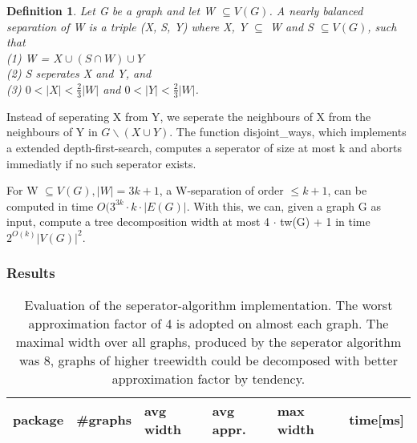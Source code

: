 \documentclass[a4wide]{article}
\newtheorem*{definition}{Definition}
\begin{document}
\begin{definition}
Let G be a graph and let W $\subseteq V(G)$. A nearly balanced separation of W is a triple (X, S, Y) where X, Y $\subseteq$ W and S $\subseteq V(G)$, such that \\

(1) W = $X \cup (S \cap W) \cup Y$ \\ 
(2) S seperates X and Y, and \\
(3) $0 < |X| < \frac{2}{3}|W|$ and $0 < |Y| < \frac{2}{3}|W|$.
\end{definition}

Instead of seperating X from Y, we seperate the neighbours of X from the neighbours of Y in $G \backslash (X \cup Y)$. The function disjoint\_ways, which implements a extended depth-first-search, computes a seperator of size at most k and aborts immediatly if no such seperator exists. 

\begin{algorithm}
\begin{algorithmic}[1]
\State {}
\State {}
\Else {}
\EndIf
\EndFor
{}
\end{algorithmic}
\end{algorithm}

For W $\subseteq V(G), |W| = 3k + 1$, a W-separation of order $\leq k + 1$, can be computed in time $O(3^{3k} \cdot k \cdot |E(G)|$. With this, we can, given a graph G as input, compute a tree decomposition width at most 4 $\cdot$ tw(G) + 1 in time $2^{O(k)}|V(G)|^{2}$. \\ 

\newpage

\subsubsection{Results}

\begin{table}[h!]
\begin{tabular}{|l|l|l|l|l|l|}
\hline
package & \#graphs & avg width & avg appr. & max width & time[ms] \\
\hline
\hline

\hline
\end{tabular}
\caption{Evaluation of the seperator-algorithm implementation. The worst approximation factor of 4 is adopted on almost each graph. The maximal width over all graphs, produced by the seperator algorithm was 8, graphs of higher treewidth could be decomposed with better approximation factor by tendency.}
\end{table}
\end{document}
